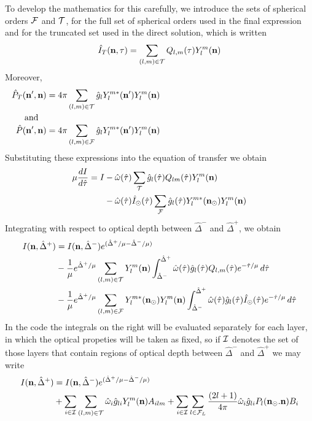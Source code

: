 To develop the mathematics for this carefully, we introduce the sets of
spherical orders $\cal F$ and $\cal T$, for the full set of spherical 
orders used in the final expression and for the truncated set used in 
the direct solution, which is written
\begin{equation}
\hat I_T(\mathbf{n}, \tau) = \sum_{(l,m)\in {\cal T}} Q_{l,m} (\tau) Y_l^m (\mathbf{n})
\end{equation}
Moreover,
\begin{align}
 \hat P_T (\bnp, \bn) &= 4\pi \sum_{(l,m)\in {\cal T}} \hat g_l Y_l^{m*} (\bnp)
Y_l^m (\bn) \\
\noalign{and}
 \hat P (\bnp, \bn) &= 4\pi \sum_{(l,m)\in {\cal F}} \hat g_l Y_l^{m*} (\bnp)
Y_l^m (\bn) \\
\end{align}
Substituting these expressions into the equation of transfer we obtain
\begin{equation}
\begin{split}
\mu {{dI}\over{d\hat\tau}} = I
&-\hat\omega(\hat\tau) \sum_{\cal T} \hat g_l(\hat \tau) Q_{lm} (\hat \tau) 
Y_l^m(\mathbf{n}) \\
&-\hat\omega(\hat\tau) \hat I_\odot (\hat \tau) 
\sum_{\cal F} \hat g_l(\hat \tau) 
Y_l^{m*} (\mathbf{n}_\odot) Y_l^m(\mathbf{n})
\end{split}
\end{equation}
Integrating with respect to optical
depth between $\hat\Delta^-$ and $\hat\Delta^+$, we obtain
\begin{equation}
\begin{split}
I(\mathbf{n}, \hat\Delta^+)  &= I(\mathbf{n}, \hat\Delta^-) e^{(\hat\Delta^+/\mu-\hat\Delta^-/\mu)} \\
&  -{1\over\mu} e^{\hat\Delta^+/\mu}\sum_{(l,m)\in{\cal T}} Y_l^m (\mathbf{n}) 
\int_{\hat\Delta^-}^{\hat\Delta^+}
\hat \omega(\hat \tau) \hat g_l(\hat\tau) Q_{l,m} (\hat\tau) 
e^{-\hat\tau/\mu} \, d\hat\tau \\
& -{1\over \mu} e^{\hat\Delta^+/\mu}\sum_{(l,m)\in{\cal F}} 
Y_l^{m*} (\mathbf{n}_\odot) Y_l^m (\mathbf{n})
\int_{\hat\Delta^-}^{\hat\Delta^+} \hat \omega(\hat \tau) \hat g_l(\hat\tau)\hat 
I_\odot (\hat\tau) e^{-\hat\tau/\mu} \, d\hat\tau 
\end{split}
\end{equation}
In the code the integrals on the right will be evaluated separately for
each layer, in which the optical propeties will be taken as fixed, so if
${\cal I}$ denotes the set of those layers that contain regions of optical
depth between $\hat\Delta^-$ and $\hat\Delta^+$ we may write
\begin{equation}
\begin{split}
I(\mathbf{n}, \hat\Delta^+)  &= I(\mathbf{n}, \hat\Delta^-) e^{(\hat\Delta^+/\mu-\hat\Delta^-/\mu)} \\
&  +\sum_{i\in\cal I} \sum_{(l,m)\in{\cal T}} 
\hat\omega_i \hat g_{li} Y_l^m (\mathbf{n}) A_{ilm}
+\sum_{i\in\cal I} \sum_{l\in{{\cal F}_L}} { {(2l+1)}\over{4\pi}}
\hat\omega_i \hat g_{li} P_l (\mathbf{n}_\odot . \mathbf{n}) B_i
\end{split}
\end{equation} 
